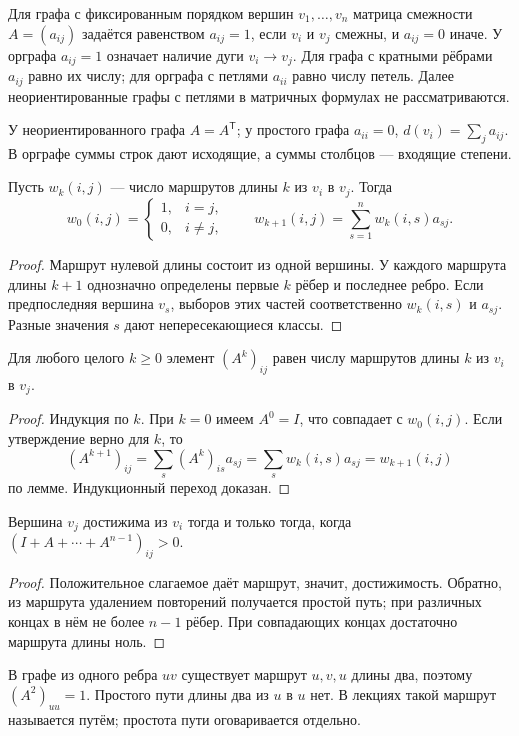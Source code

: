 \begin{definition}
Для графа с фиксированным порядком вершин \(v_1,\ldots,v_n\) матрица
смежности \(A=(a_{ij})\) задаётся равенством \(a_{ij}=1\), если \(v_i\)
и \(v_j\) смежны, и \(a_{ij}=0\) иначе. У орграфа \(a_{ij}=1\)
означает наличие дуги \(v_i\to v_j\).
Для графа с кратными рёбрами \(a_{ij}\) равно их числу; для орграфа
с петлями \(a_{ii}\) равно числу петель. Далее неориентированные графы
с петлями в матричных формулах не рассматриваются.
\end{definition}
У неориентированного графа \(A=A^{\mathsf T}\); у простого графа
\(a_{ii}=0\), \(d(v_i)=\sum_j a_{ij}\). В орграфе суммы строк дают
исходящие, а суммы столбцов — входящие степени.


\begin{lemma}
Пусть \(w_k(i,j)\) — число маршрутов длины \(k\) из \(v_i\) в \(v_j\).
Тогда
\[
 w_0(i,j)=\begin{cases}1,&i=j,\\0,&i\ne j,\end{cases}
 \qquad w_{k+1}(i,j)=\sum_{s=1}^n w_k(i,s)a_{sj}.
\]
\end{lemma}
\begin{proof}
Маршрут нулевой длины состоит из одной вершины. У каждого маршрута
длины \(k+1\) однозначно определены первые \(k\) рёбер и последнее ребро.
Если предпоследняя вершина \(v_s\), выборов этих частей соответственно
\(w_k(i,s)\) и \(a_{sj}\). Разные значения \(s\) дают непересекающиеся классы.
\end{proof}
\begin{theorem}
Для любого целого \(k\ge0\) элемент \((A^k)_{ij}\) равен числу маршрутов
длины \(k\) из \(v_i\) в \(v_j\).
\end{theorem}
\begin{proof}
Индукция по \(k\). При \(k=0\) имеем \(A^0=I\), что совпадает
с \(w_0(i,j)\). Если утверждение верно для \(k\), то
\[
 (A^{k+1})_{ij}=\sum_s(A^k)_{is}a_{sj}
 =\sum_s w_k(i,s)a_{sj}=w_{k+1}(i,j)
\]
по лемме. Индукционный переход доказан.
\end{proof}
\begin{cor}
Вершина \(v_j\) достижима из \(v_i\) тогда и только тогда, когда
\((I+A+\cdots+A^{n-1})_{ij}>0\).
\end{cor}
\begin{proof}
Положительное слагаемое даёт маршрут, значит, достижимость.
Обратно, из маршрута удалением повторений получается простой путь;
при различных концах в нём не более \(n-1\) рёбер. При совпадающих
концах достаточно маршрута длины ноль.
\end{proof}
\begin{example}
В графе из одного ребра \(uv\) существует маршрут \(u,v,u\) длины два,
поэтому \((A^2)_{uu}=1\). Простого пути длины два из \(u\) в \(u\) нет.
В лекциях такой маршрут называется путём; простота пути оговаривается отдельно.
\end{example}
